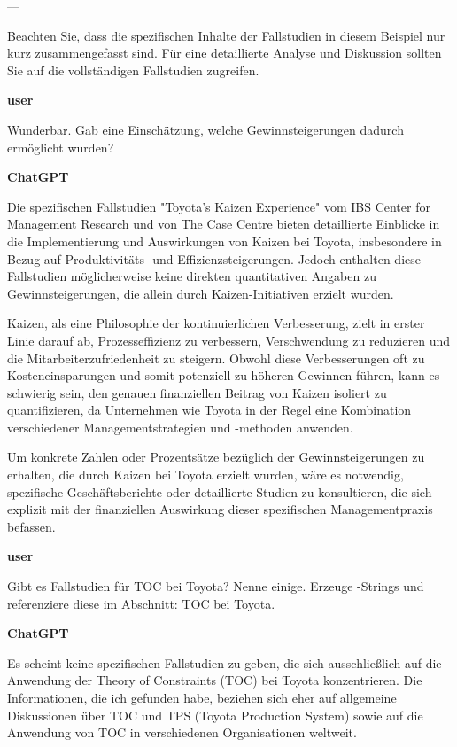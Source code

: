 ---

Beachten Sie, dass die spezifischen Inhalte der Fallstudien in diesem Beispiel nur kurz zusammengefasst sind. Für eine detaillierte Analyse und Diskussion sollten Sie auf die vollständigen Fallstudien zugreifen.

\textbf{user}

Wunderbar. Gab eine Einschätzung, welche Gewinnsteigerungen dadurch ermöglicht wurden?

\textbf{ChatGPT}

Die spezifischen Fallstudien "Toyota's Kaizen Experience" vom IBS Center for Management Research und von The Case Centre bieten detaillierte Einblicke in die Implementierung und Auswirkungen von Kaizen bei Toyota, insbesondere in Bezug auf Produktivitäts- und Effizienzsteigerungen. Jedoch enthalten diese Fallstudien möglicherweise keine direkten quantitativen Angaben zu Gewinnsteigerungen, die allein durch Kaizen-Initiativen erzielt wurden.

Kaizen, als eine Philosophie der kontinuierlichen Verbesserung, zielt in erster Linie darauf ab, Prozesseffizienz zu verbessern, Verschwendung zu reduzieren und die Mitarbeiterzufriedenheit zu steigern. Obwohl diese Verbesserungen oft zu Kosteneinsparungen und somit potenziell zu höheren Gewinnen führen, kann es schwierig sein, den genauen finanziellen Beitrag von Kaizen isoliert zu quantifizieren, da Unternehmen wie Toyota in der Regel eine Kombination verschiedener Managementstrategien und -methoden anwenden.

Um konkrete Zahlen oder Prozentsätze bezüglich der Gewinnsteigerungen zu erhalten, die durch Kaizen bei Toyota erzielt wurden, wäre es notwendig, spezifische Geschäftsberichte oder detaillierte Studien zu konsultieren, die sich explizit mit der finanziellen Auswirkung dieser spezifischen Managementpraxis befassen.

\textbf{user}

Gibt es Fallstudien für TOC bei Toyota? Nenne einige. Erzeuge \BibTeX{}-Strings und referenziere diese im Abschnitt: TOC bei Toyota.

\textbf{ChatGPT}

Es scheint keine spezifischen Fallstudien zu geben, die sich ausschließlich auf die Anwendung der Theory of Constraints (TOC) bei Toyota konzentrieren. Die Informationen, die ich gefunden habe, beziehen sich eher auf allgemeine Diskussionen über TOC und TPS (Toyota Production System) sowie auf die Anwendung von TOC in verschiedenen Organisationen weltweit. 

